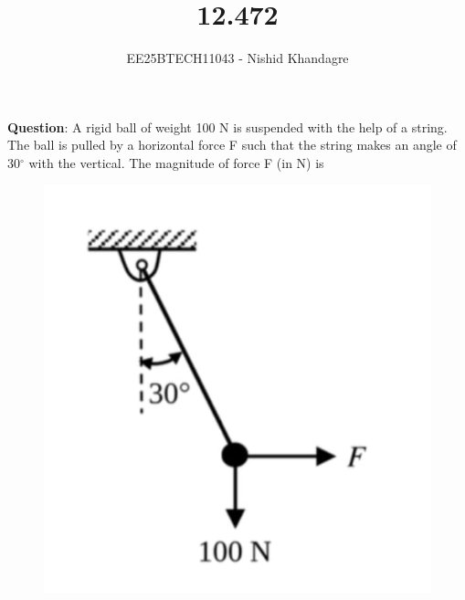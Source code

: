 \documentclass[journal]{IEEEtran}
\title{12.472}
\author{EE25BTECH11043 - Nishid Khandagre}
\begin{document}
\maketitle

\renewcommand{\thefigure}{\theenumi}
\renewcommand{\thetable}{\theenumi}


\textbf{Question}:
A rigid ball of weight 100 N is suspended with the help of a string. The ball is pulled by a horizontal force F such that the string makes an angle of 30$^\circ$ with the vertical. The magnitude of force F (in N) is 

\begin{figure}[H]
\centering
\includegraphics[width=0.4\columnwidth]{figs/fig.jpg}
\caption{}
\label{fig:2}
\end{figure}
\end{document}
